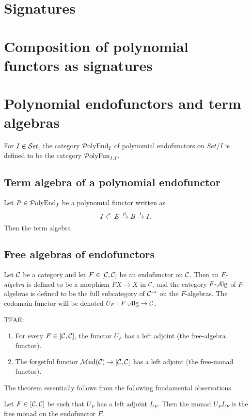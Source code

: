 \newcommand{\PolyEnd}{{\mathrm{\cP olyEnd}}}
\newcommand{\PolyFun}{{\mathrm{\cP olyFun}}}
\newcommand{\PolyMnd}{{\mathrm{\cP olyMnd}}}

\section{Signatures}
\section{Composition of polynomial functors as signatures}

\section{Polynomial endofunctors and term algebras}
For $I\in{\mathcal{S} et}$, the category $\PolyEnd_I$ of polynomial endofunctors on $Set/I$
is defined to be the category $\PolyFun_{I,I}$.

\subsection{Term algebra of a polynomial endofunctor}
Let $P\in\PolyEnd_I$ be a polynomial functor written as
\[
    I\xleftarrow {s} E\xrightarrow {p} B\xrightarrow {t} I.
\]
Then the term algebra

\subsection{Free algebras of endofunctors}
Let $\mathcal{C}$ be a category and let $F\in [\mathcal{C},\mathcal{C}]$ be an endofunctor on $\mathcal{C}$.
Then an \emph{$F$-algebra} is defined to be a morphism $FX\to X$ in $\mathcal{C}$, and
the category $F{\text{-} \mathrm{\mathcal{A} lg}}$ of $F$-algebras is defined to be the full subcategory of
$\mathcal{C}^\rightarrow$ on the $F$-algebras. The codomain functor will be denoted
$U_F:F{\text{-} \mathrm{\mathcal{A} lg}}\to\mathcal{C}$.

\begin{theorem} \label{thm:free-monad}
    TFAE:
    \begin{enumerate}
    \item For every $F\in[\mathcal{C},\mathcal{C}]$, the functor $U_F$ has a left adjoint (the
        free-algebra functor).
    \item The forgetful functor ${\mathrm{\mathcal{M} nd}}(\mathcal{C})\to[\mathcal{C},\mathcal{C}]$ has a left adjoint (the
        free-monad functor).
    \end{enumerate}
\end{theorem}

The theorem essentially follows from the following fundamental observations.
\begin{proposition}
    Let $F\in\left[\mathcal{C},\mathcal{C}\right]$ be such that $U_F$ has a left adjoint $L_F$. Then the
    monad $U_FL_F$ is the free monad on the endofunctor $F$.
\end{proposition}

